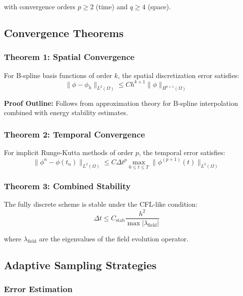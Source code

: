 with convergence orders $p \geq 2$ (time) and $q \geq 4$ (space).

\subsection{Convergence Theorems}

\subsubsection{Theorem 1: Spatial Convergence}

For B-spline basis functions of order $k$, the spatial discretization error satisfies:
\begin{equation}
\|\phi - \phi_h\|_{L^2(\Omega)} \leq C h^{k+1} \|\phi\|_{H^{k+1}(\Omega)}
\end{equation}

\textbf{Proof Outline:} Follows from approximation theory for B-spline interpolation combined with energy stability estimates.

\subsubsection{Theorem 2: Temporal Convergence}

For implicit Runge-Kutta methods of order $p$, the temporal error satisfies:
\begin{equation}
\|\phi^n - \phi(t_n)\|_{L^2(\Omega)} \leq C \Delta t^p \max_{0 \leq t \leq T} \|\phi^{(p+1)}(t)\|_{L^2(\Omega)}
\end{equation}

\subsubsection{Theorem 3: Combined Stability}

The fully discrete scheme is stable under the CFL-like condition:
\begin{equation}
\Delta t \leq C_{\text{stab}} \frac{h^2}{\max|\lambda_{\text{field}}|}
\end{equation}

where $\lambda_{\text{field}}$ are the eigenvalues of the field evolution operator.

\subsection{Adaptive Sampling Strategies}

\subsubsection{Error Estimation}

